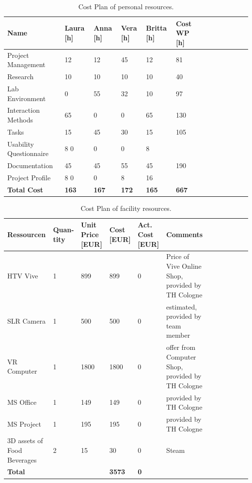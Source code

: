 \begin{table}[H]
	\centering
	\begin{tabular}{|p{5cm}|p{1 cm}|p{1 cm}|p{1cm}|p{1.5 cm}|p{1 cm}|p{2 cm}|  l l l l l l  }
		\hline
		\Absatzbox{}
	\textbf{Name}&	\textbf{Laura [h]} &\textbf{Anna [h]} &	\textbf{Vera [h]} &\textbf{	Britta [h]} &	\textbf{Cost WP [h]} \\ \hline
	Project Management &	12&	12&	45&	12&	81\\ \hline
	Research&	10	&10	&10&	10	&40\\ \hline
	Lab Environment&	0&	55&	32	&10&	97\\ \hline
	Interaction Methods	&65&	0&	0&	65	&130\\ \hline
	Tasks	&15&	45	&30&	15&	105\\ \hline
	Usability Questionnaire	&8	0&	0&	0&	8\\ \hline
	Documentation	&45	&45&	55&	45&	190\\ \hline
	Project Profile	&8	0&	0&	8&	16\\ \hline
	\textbf{Total Cost}	&\textbf{163}&	\textbf{167}	&\textbf{172}&	\textbf{165}	&\textbf{667}\\ \hline
	
	\end{tabular}
	\caption[]{Cost Plan of personal resources.}
	\label{tab:Personal Cost Plan}
\end{table}

\begin{table}[H]
	\centering
	\begin{tabular}{|p{3cm}|p{1 cm}|p{1.5 cm}|p{1.5cm}|p{1.5 cm}|p{3.5 cm}| l l l l l l  }
		\hline
		\Absatzbox{}
		\textbf{Ressourcen}	&\textbf{Quan- tity}&	\textbf{Unit Price [EUR]}&	\textbf{Cost [EUR]}&\textbf{Act. Cost [EUR]}&\textbf{Comments} \\ \hline
			 HTV Vive  &	1	&899&	899&	0	&Price of Vive Online Shop, provided by TH Cologne\\ \hline
			 SLR Camera&	1	&500&	500&	0	&estimated, provided by team member\\ \hline
			 VR Computer&	1	&1800&	1800	&0	&offer from Computer Shop, provided by TH Cologne\\ \hline
			 MS Office	&1	&149&	149&	0&	provided by TH Cologne\\ \hline
			MS Project&	1	&195&	195&	0&	provided by TH Cologne\\ \hline
			3D assets of Food Beverages&	2&	15&	30&	0	&Steam\\ \hline
	\textbf{Total}	&	& &	\textbf{3573}	&\textbf{0}	&\\ \hline
		
	
	\end{tabular}
	\caption[]{Cost Plan of facility resources.}
	\label{tab:facility Cost Plan}
\end{table}


